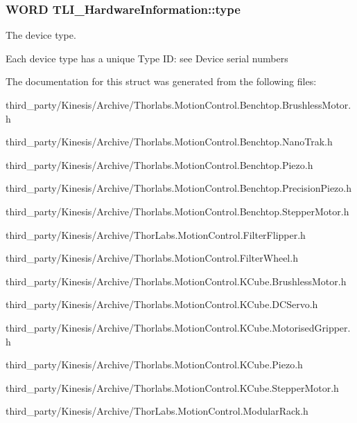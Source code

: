 \subsubsection[{\texorpdfstring{type}{type}}]{\setlength{\rightskip}{0pt plus 5cm}W\+O\+RD T\+L\+I\+\_\+\+Hardware\+Information\+::type}\hypertarget{struct_t_l_i___hardware_information_a80d88eee72548d71a89e2c0187fd2b7c}{}\label{struct_t_l_i___hardware_information_a80d88eee72548d71a89e2c0187fd2b7c}


The device type. 

Each device type has a unique Type ID\+: see Device serial numbers 

The documentation for this struct was generated from the following files\+:\begin{DoxyCompactItemize}
\item 
third\+\_\+party/\+Kinesis/\+Archive/Thorlabs.\+Motion\+Control.\+Benchtop.\+Brushless\+Motor.\+h\item 
third\+\_\+party/\+Kinesis/\+Archive/Thorlabs.\+Motion\+Control.\+Benchtop.\+Nano\+Trak.\+h\item 
third\+\_\+party/\+Kinesis/\+Archive/Thorlabs.\+Motion\+Control.\+Benchtop.\+Piezo.\+h\item 
third\+\_\+party/\+Kinesis/\+Archive/Thorlabs.\+Motion\+Control.\+Benchtop.\+Precision\+Piezo.\+h\item 
third\+\_\+party/\+Kinesis/\+Archive/Thorlabs.\+Motion\+Control.\+Benchtop.\+Stepper\+Motor.\+h\item 
third\+\_\+party/\+Kinesis/\+Archive/Thor\+Labs.\+Motion\+Control.\+Filter\+Flipper.\+h\item 
third\+\_\+party/\+Kinesis/\+Archive/Thorlabs.\+Motion\+Control.\+Filter\+Wheel.\+h\item 
third\+\_\+party/\+Kinesis/\+Archive/Thorlabs.\+Motion\+Control.\+K\+Cube.\+Brushless\+Motor.\+h\item 
third\+\_\+party/\+Kinesis/\+Archive/Thorlabs.\+Motion\+Control.\+K\+Cube.\+D\+C\+Servo.\+h\item 
third\+\_\+party/\+Kinesis/\+Archive/Thorlabs.\+Motion\+Control.\+K\+Cube.\+Motorised\+Gripper.\+h\item 
third\+\_\+party/\+Kinesis/\+Archive/Thorlabs.\+Motion\+Control.\+K\+Cube.\+Piezo.\+h\item 
third\+\_\+party/\+Kinesis/\+Archive/Thorlabs.\+Motion\+Control.\+K\+Cube.\+Stepper\+Motor.\+h\item 
third\+\_\+party/\+Kinesis/\+Archive/Thor\+Labs.\+Motion\+Control.\+Modular\+Rack.\+h\item 

\end{DoxyCompactItemize}
